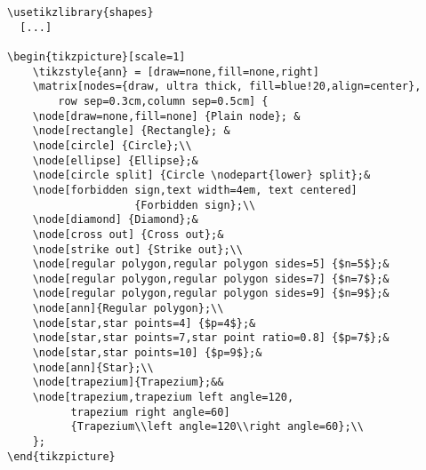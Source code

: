 \begin{verbatim}
\usetikzlibrary{shapes}
  [...]
   
\begin{tikzpicture}[scale=1]
    \tikzstyle{ann} = [draw=none,fill=none,right]
    \matrix[nodes={draw, ultra thick, fill=blue!20,align=center},
        row sep=0.3cm,column sep=0.5cm] {
    \node[draw=none,fill=none] {Plain node}; &
    \node[rectangle] {Rectangle}; &
    \node[circle] {Circle};\\
    \node[ellipse] {Ellipse};&
    \node[circle split] {Circle \nodepart{lower} split};&
    \node[forbidden sign,text width=4em, text centered]
                    {Forbidden sign};\\
    \node[diamond] {Diamond};&
    \node[cross out] {Cross out};&
    \node[strike out] {Strike out};\\
    \node[regular polygon,regular polygon sides=5] {$n=5$};&
    \node[regular polygon,regular polygon sides=7] {$n=7$};&
    \node[regular polygon,regular polygon sides=9] {$n=9$};&
    \node[ann]{Regular polygon};\\
    \node[star,star points=4] {$p=4$};&
    \node[star,star points=7,star point ratio=0.8] {$p=7$};&
    \node[star,star points=10] {$p=9$};&
    \node[ann]{Star};\\
    \node[trapezium]{Trapezium};&&
    \node[trapezium,trapezium left angle=120,
          trapezium right angle=60]
          {Trapezium\\left angle=120\\right angle=60};\\
    };
\end{tikzpicture}
\end{verbatim}

